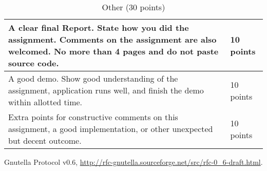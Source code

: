 \documentclass[12pt, a4paper]{article}
\begin{document}
\begin{table}[htdp]
\caption{Other (30 points)}
\begin{center}
\begin{tabular}{|p{12cm}|p{2cm}|}
\hline
A clear final Report.
State how you did the assignment.
Comments on the assignment are also welcomed.
No more than 4 pages and do not paste source code. & 10 points \\
\hline
A good demo.
Show good understanding of the assignment, application runs well, and finish the demo within allotted time. & 10 points \\
\hline
Extra points for constructive comments on this assignment, a good implementation, or other unexpected but decent outcome. & 10 points \\

\hline
\end{tabular}
\end{center}
\end{table}


\FloatBarrier

\begin{thebibliography}{1}

Gnutella Protocol v0.6, \url{http://rfc-gnutella.sourceforge.net/src/rfc-0\_6-draft.html}.

\end{thebibliography}
\end{document}
